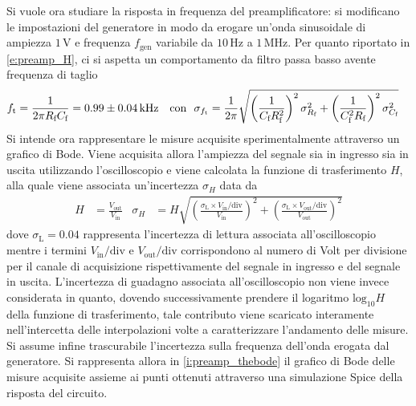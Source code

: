 \documentclass[a4paper,11pt]{article} %
\begin{document}
Si vuole ora studiare la risposta in frequenza del preamplificatore: si modificano le impostazioni del generatore in
modo da erogare un'onda sinusoidale di ampiezza $1\,\si{\volt}$ e frequenza $f_{\text{gen}}$ variabile da $10\,\si{\Hz}$
a $1\,\si{\MHz}$. Per quanto riportato in \autoref{e:preamp_H}, ci si aspetta un comportamento da filtro passa basso
avente frequenza di taglio
\begin{align}\label{e:preamp_ft_th}
	f_{\text{t}}&=\frac{1}{2\pi R_{\text{f}}C_{\text{f}}}= 0.99 \pm 0.04 \,\si{k\Hz} & 
	\text{con\,\,\,\,}\sigma_{f_{\text{t}}}&
	=\frac{1}{2\pi}\sqrt{	\left(\frac{1}{C_{\text{f}}R_{\text{f}}^2}\right)^2\sigma_{R_{\text{f}}}^2	+
	 \left(\frac{1}{C_{\text{f}}^2R_{\text{f}}}\right)^2\sigma_{C_{\text{f}}}^2   }																		
\end{align}
\noindent Si intende ora rappresentare le misure acquisite sperimentalmente attraverso un grafico di Bode. Viene
acquisita allora l'ampiezza del segnale sia in ingresso sia in uscita utilizzando l'oscilloscopio e viene calcolata la
funzione di trasferimento $H$, alla quale viene associata un'incertezza $\sigma_{H}$ data da
\begin{align}\label{e:preamp_H_err}
	H&=\frac{V_{\text{out}}}{V_{\text{in}}} & 
	\sigma_{H}&= H \sqrt{	
						\left(	\frac{	\sigma_{\text{L}}\times V_{\text{in}}/\text{div}	}{	V_{\text{in}}	}	\right)^2	 + 
						\left(	\frac{	\sigma_{\text{L}}\times V_{\text{out}}/\text{div}	}{	V_{\text{out}}	}	\right)^2 }
\end{align}
\noindent dove $\sigma_{\text{L}}=0.04$ rappresenta l'incertezza di lettura associata all'oscilloscopio mentre i termini
$V_{\text{in}}/\text{div}$ e $V_{\text{out}}/\text{div}$ corrispondono al numero di Volt per divisione per il canale di
acquisizione rispettivamente del segnale in ingresso e del segnale in uscita. L'incertezza di guadagno associata
all'oscilloscopio non viene invece considerata in quanto, dovendo successivamente prendere il logaritmo
$\text{log}_{10}H$ della funzione di trasferimento, tale contributo viene scaricato interamente nell'intercetta delle
interpolazioni volte a caratterizzare l'andamento delle misure. Si assume infine trascurabile l'incertezza sulla
frequenza dell'onda erogata dal generatore. Si rappresenta allora in \autoref{i:preamp_thebode} il grafico di Bode delle
misure acquisite assieme ai punti ottenuti attraverso una simulazione Spice della risposta del circuito.
\end{document}
